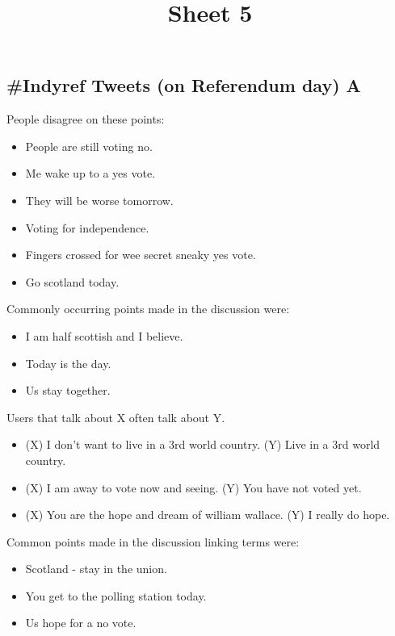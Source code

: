 \documentclass[tikz]{article}
\title{\textbf{Sheet 5}\vspace{-9ex}}
\date{}
\begin{document}
  \maketitle

  \begin{multicols}{2}
    \subsection*{\#Indyref Tweets (on Referendum day) A}
    People disagree on these points:
    \begin{itemize}[noitemsep,nolistsep,label={}]
		\item{People are still voting no.}
		\item{Me wake up to a yes vote.}
		\item{They will be worse tomorrow.}
		\item{Voting for independence.}
		\item{Fingers crossed for wee secret sneaky yes vote.}
		\item{Go scotland today.}
    \end{itemize}

    Commonly occurring points made in the discussion were:
    \begin{itemize}[noitemsep,nolistsep,label={}]
		\item{I am half scottish and I believe.}
		\item{Today is the day.}
		\item{Us stay together.}
    \end{itemize}

    Users that talk about X often talk about Y.
    \begin{itemize}[noitemsep,nolistsep,label={}]
		\item{(X) I don't want to live in a 3rd world country. (Y) Live in a 3rd world country.}
		\item{(X) I am away to vote now and seeing. (Y) You have not voted yet.}
		\item{(X) You are the hope and dream of william wallace. (Y) I really do hope.}
    \end{itemize}

    Common points made in the discussion linking terms were:
    \begin{itemize}[noitemsep,nolistsep,label={}]
		\item{Scotland - stay in the union.}
		\item{You get to the polling station today.}
		\item{Us hope for a no vote.}
    \end{itemize}


\end{multicols}
\end{document}
